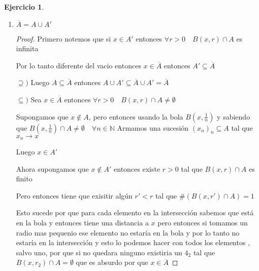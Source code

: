 \documentclass[12pt]{report}
\newcommand{\N}{\mathbb{N}}
\newcommand{\ra}{\rightarrow}
\newcommand{\ol}{\overline}
\theoremstyle{definition}
\newtheorem{ej}{Ejercicio}
\begin{document}
\begin{ej}
\begin{enumerate}
\begin{enumerate}
\begin{proof}
	    Entonces $x_{n} \in A$ o $x_{n} \in B$ para infinitos términos , si no tendría infinitos términos fuera de $A$ y fuera de $B$ lo que es absurdo. Quizas para los dos , pero no importa.

	    Spd $x_{n} \in A$ para infinitos términos entonces me quedo con todos los términos de $x_{n}$ tal que $x_{n} \in A$ esto es una subsucesión de $x_{n}$ entonces converge a $x$ por lo tanto tengo una sucesión contenida en $A$ que converge a $x$ luego $x \in A'$

	    Entonces $x \in A' \cup B'$
	    \newpage

	  $\supseteq )$ Sea $x \in A' \cup B'$ spd $x \in A'$ luego existe $(a_{n})_{n \in \N} \subseteq A$ tal que $a_{n} \ra a$

	  Pero entonces $(a_{n})_{n} \subseteq A \cup B$ por lo tanto $a \in (A \cup B)'$
	  \end{proof}
	\item $\ol A = A \cup A'$
	  \begin{proof}
	  Primero notemos que si $x \in A'$ entonces $\forall r > 0 \quad  B(x,r) \cap A$ es infinita 

	 Por lo tanto diferente del vacio entonces $x \in \ol A$ entonces $A' \subseteq \ol A$

	  $\supseteq ) $ Luego $A \subseteq \ol A$ entonces $A \cup A' \subseteq \ol A \cup A' = \ol A$

	$\subseteq )$ Sea $x \in \ol A$ entonces $\forall r>0 \quad  B(x,r) \cap A \neq \emptyset$

	Supongamos que $x \notin A$, pero entonces usando la bola $B(x,\frac{1}{n})$ y sabiendo que $B(x,\frac{1}{n}) \cap A \neq \emptyset \quad  \forall n \in \N$ Armamos una sucesión $(x_{n})_{n} \subseteq A$ tal que $x_{n} \ra x$

	Luego $x \in A'$

	Ahora supongamos que $x \notin A'$ entonces existe $r>0$ tal que $B(x,r) \cap A$ es finito

      Pero entonces tiene que exisitir algún $r'<r$ tal que $\# (B(x,r') \cap A )= 1$

      Esto sucede por que para cada elemento en la intersección sabemos que está en la bola y entonces tiene una distancia a $x$ pero entonces si tomamos un radio mas pequenio ese elemento no estaría en la bola y por lo tanto no estaría en la intersección y esto lo podemos hacer con todos los elementos , salvo uno, por que si no quedara ninguno existiria un $4_{2}$ tal que $B(x,r_{2}) \cap A = \emptyset$ que es absurdo por que $x \in \ol A$


\end{proof}
\end{enumerate}
\end{enumerate}
\end{ej}
\end{document}
